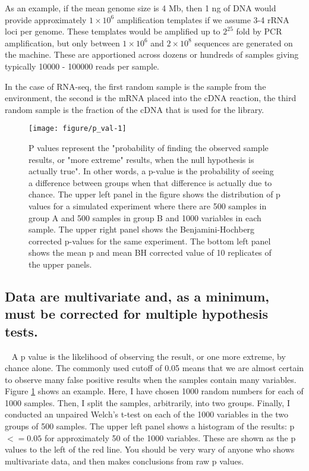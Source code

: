 \documentclass[11pt]{article}\usepackage[]{graphicx}\usepackage[]{color}
\makeatletter
\def\maxwidth{ %
  \ifdim\Gin@nat@width>\linewidth
    \linewidth
  \else
    \Gin@nat@width
  \fi
}
\newenvironment{knitrout}{}{} %
\makeatother
\begin{document}
As an example, if the mean genome size is 4 Mb, then 1 ng of DNA would provide approximately $1\times 10^6$ amplification templates if we assume 3-4 rRNA loci per genome. These templates would be amplified up to $2^{25}$ fold by PCR amplification, but only between $1 \times 10^6$ and $2 \times 10^8$ sequences are generated on the machine. These are apportioned across dozens or hundreds of samples giving typically 10000 - 100000 reads per sample. 

In the case of RNA-seq, the first random sample is the sample from the environment, the second is the mRNA placed into the cDNA reaction, the third random sample is the fraction of the cDNA that is used for the library.

\begin{figure}
\begin{center}

\begin{knitrout}
\color{fgcolor}
\texttt{[image: figure/p\_val-1]} 

\end{knitrout}
\caption{P values represent the "probability of finding the observed sample results, or "more extreme" results, when the null hypothesis is actually true". In other words, a p-value is the probability of seeing a difference between groups when that difference is actually due to chance. The upper left panel in the figure shows the distribution of p values for a simulated experiment where there are 500 samples in group A and 500 samples in group B and 1000 variables in each sample. The upper right panel shows the Benjamini-Hochberg corrected p-values for the same experiment. The bottom left panel shows the mean p and mean BH corrected value of 10 replicates of the upper panels.  }
\label{pval}
\end{center}
\end{figure}

\subsection{Data are multivariate and, as a minimum, must be corrected for multiple hypothesis tests.}~ A p value is the likelihood of observing the result, or one more extreme, by chance alone. The commonly used cutoff of 0.05 means that we are almost certain to observe many false positive results when the samples contain many variables. Figure \ref{pval} shows an example. Here, I have chosen 1000 random numbers for each of 1000 samples. Then, I split the samples, arbitrarily, into two groups. Finally, I conducted an unpaired Welch's t-test on each of the 1000 variables in the two groups of 500 samples. The upper left panel shows a histogram of the results: p$<= 0.05$ for approximately 50 of the 1000 variables. These are shown as the p values to the left of the red line. You should be very wary of anyone who shows multivariate data, and then makes conclusions from raw p values. 
\end{document}
